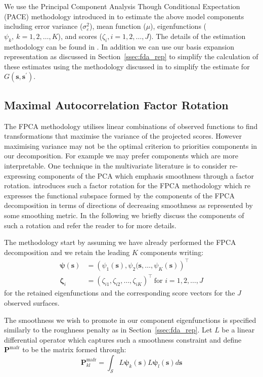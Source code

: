 \documentclass{article}
\newcommand{\ve}[1]{\bm{{#1}}}
\begin{document}
We use the Principal Component Analysis Though Conditional Expectation (PACE) methodology introduced in \citet{yao_functional_2005} to estimate the above model components including error variance ($\sigma_\varepsilon^2$), mean function ($\mu$),  eigenfunctions ($\psi_k,~k=1,2,\dots,K$), and scores ($\zeta_i, i=1,2,\dots, J$). The details of the estimation methodology can be found in \citet{yao_functional_2005}. In addition we can use our basis expansion representation as discussed in Section~\ref{ssec:fda_rep} to simplify the calculation of these estimates using the methodology discussed in \citet{ramsay_functional_2010} to simplify the estimate for $G\left( \ve{s}, \ve{s}^\prime \right)$.

\subsection{\label{ssec:mafr}Maximal Autocorrelation Factor Rotation}
The FPCA methodology utilises linear combinations of observed functions to find transformations that maximise the variance of the projected scores. However maximising variance may not be the optimal criterion to priorities components in our decomposition. For example we may prefer components which are more interpretable. One technique in the multivariate literature is to consider re-expressing components of the PCA which emphasis smoothness through a factor rotation. \citet{hooker_maximal_2016} introduces such a factor rotation for the FPCA methodology which re expresses  the functional subspace formed by the components of the FPCA decomposition in terms of directions of decreasing smoothness as represented by some smoothing metric. In the following we briefly discuss the components of such a rotation and refer the reader to \citet{hooker_maximal_2016} for more details.

The methodology start by assuming we have already performed the FPCA decomposition and we retain the leading $K$ components writing:
\begin{align*}
  \ve{\psi}\left( \ve{s} \right) &= \left( \psi_1(\ve{s}), \psi_2(\ve{s}, \dots, \psi_K(\ve{s})  \right)^\top \\
    \ve{\zeta}_i &= \left( \zeta_{i1}, \zeta_{i2}, \dots, \zeta_{iK} \right)^\top~\text{for } i=1,2,\dots,J
\end{align*}
for the retained eigenfunctions and the corresponding score vectors for the $J$ observed surfaces. 

The smoothness we wish to promote in our component eigenfunctions is specified similarly to the roughness penalty as in Section~\ref{ssec:fda_rep}.  Let $L$ be a linear differential operator which captures such a smoothness constraint and define $\ve{P}^\text{mafr}$ to be the matrix formed through:
\begin{equation}
  \ve{P}^\text{mafr}_{kl} = \int_\mathcal{S} L\ve{\psi}_k\left(\ve{s}\right) L\ve{\psi}_l \left( \ve{s} \right) d\ve{s}
  \label{eqn:mafr_pen}
\end{equation}
\end{document}
